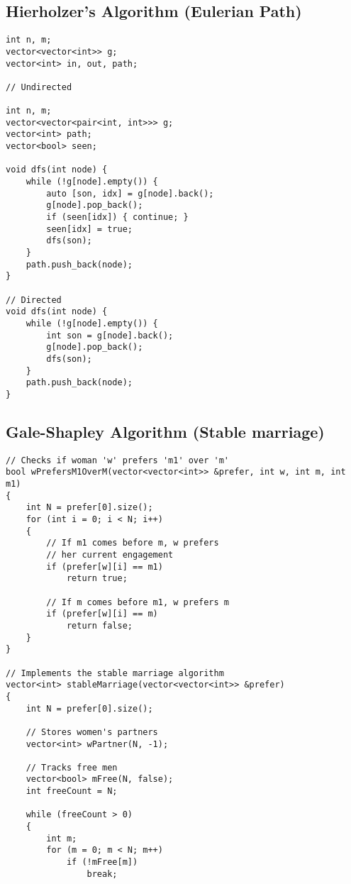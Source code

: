 \documentclass[10pt]{article}
\begin{document}
\begin{multicols*}{2}
\subsection{Hierholzer's Algorithm (Eulerian Path)}

\begin{lstlisting}[style=compactcpp]
int n, m;
vector<vector<int>> g;
vector<int> in, out, path;

// Undirected

int n, m;
vector<vector<pair<int, int>>> g;
vector<int> path;
vector<bool> seen;

void dfs(int node) {
	while (!g[node].empty()) {
		auto [son, idx] = g[node].back();
		g[node].pop_back();
		if (seen[idx]) { continue; }
		seen[idx] = true;
		dfs(son);
	}
	path.push_back(node);
}

// Directed
void dfs(int node) {
	while (!g[node].empty()) {
		int son = g[node].back();
		g[node].pop_back();
		dfs(son);
	}
	path.push_back(node);
}

\end{lstlisting}

\subsection{Gale-Shapley Algorithm (Stable marriage)}

\begin{lstlisting}[style=compactcpp]
// Checks if woman 'w' prefers 'm1' over 'm'
bool wPrefersM1OverM(vector<vector<int>> &prefer, int w, int m, int m1)
{
    int N = prefer[0].size();
    for (int i = 0; i < N; i++)
    {
        // If m1 comes before m, w prefers
        // her current engagement
        if (prefer[w][i] == m1)
            return true;

        // If m comes before m1, w prefers m
        if (prefer[w][i] == m)
            return false;
    }
}

// Implements the stable marriage algorithm
vector<int> stableMarriage(vector<vector<int>> &prefer)
{
    int N = prefer[0].size();

    // Stores women's partners
    vector<int> wPartner(N, -1);

    // Tracks free men
    vector<bool> mFree(N, false);
    int freeCount = N;

    while (freeCount > 0)
    {
        int m;
        for (m = 0; m < N; m++)
            if (!mFree[m])
                break;


\end{lstlisting}
\end{multicols*}
\end{document}
